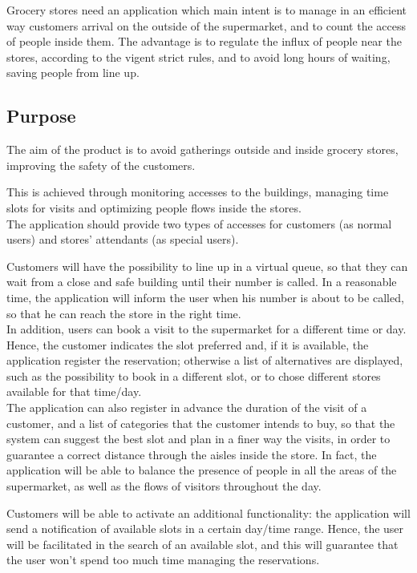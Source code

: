 \documentclass[table, 12pt]{article}
\begin{document}
Grocery stores need an application which main intent is to manage in an efficient way customers arrival on the outside of the supermarket, and to count the access of people inside them. The advantage is to regulate the influx of people near the stores, according to the vigent strict rules, and to avoid long hours of waiting, saving people from line up.

\subsection{Purpose}
The aim of the product is to avoid gatherings outside and inside grocery stores,  improving the safety of the customers.

This is achieved through monitoring accesses to the buildings, managing time slots for visits and optimizing people flows inside the stores.\\

The application should provide two types of accesses for customers (as normal users) and stores' attendants (as special users).

Customers will have the possibility to line up in a virtual queue, so that they can wait from a close and safe building until their number is called. In a reasonable time, the application will inform the user when his number is about to be called, so that he can reach the store in the right time.\\

In addition, users can book a visit to the supermarket for a different time or day. Hence, the customer indicates the slot preferred and, if it is available, the application register the reservation; otherwise a list of alternatives are displayed, such as the possibility to book in a different slot, or to chose different stores available for that time/day.\\

The application can also register in advance the duration of the visit of a customer, and a list of categories that the customer intends to buy, so that the system can suggest the best slot and plan in a finer way the visits, in order to guarantee a correct distance through the aisles inside the store. In fact, the application will be able to balance the presence of people in all the areas of the supermarket, as well as the flows of visitors throughout the day.

Customers will be able to activate an additional functionality: the application will send a notification of available slots in a certain day/time range. Hence, the user will be facilitated in the search of an available slot, and this will guarantee that the user won't spend too much time managing the reservations.\\
\end{document}
